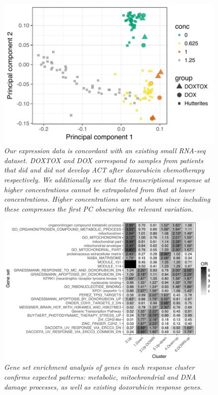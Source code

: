 \documentclass{article}
\begin{document}
\begin{figure}[h]
\begin{center}
    \includegraphics[width=.6\textwidth]{../figures/burridge_comparison.pdf} %
    \caption{\it{Our expression data is concordant with an existing small RNA-seq dataset\citep{Burridge2016}. DOXTOX and DOX correspond to samples from patients that did and did not develop ACT after doxorubicin chemotherapy respectively. We additionally see that the transcriptional response at higher concentrations cannot be extrapolated from that at lower concentrations. Higher concentrations are not shown since including these compresses the first PC obscuring the relevant variation.}}
    \label{fig:burridge}
    \end{center}
\end{figure}

\begin{figure}[h]
\begin{center}
    \includegraphics[width=1\textwidth]{../figures/cluster_go.pdf} %
    \caption{\it{Gene set enrichment analysis of genes in each response cluster confirms expected patterns: metabolic, mitochrondrial and DNA damage processes, as well as existing doxorubicin response genes.}}
    \label{fig:go}
    \end{center}
\end{figure}
\end{document}
